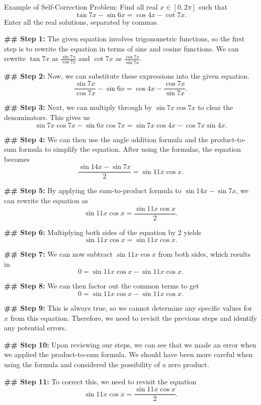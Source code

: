 \begin{promptbox}{Example of Self-Correction}
Problem: Find all real $x \in [0, 2 \pi]$ such that
\[\tan 7x - \sin 6x = \cos 4x - \cot 7x.\]
Enter all the real solutions, separated by commas.

\textbf{\#\# Step 1:} The given equation involves trigonometric functions, so the first step is to rewrite the equation in terms of sine and cosine functions. We can rewrite $\tan 7x$ as $\frac{\sin 7x}{\cos 7x}$ and $\cot 7x$ as $\frac{\cos 7x}{\sin 7x}.$

\textbf{\#\# Step 2:} Now, we can substitute these expressions into the given equation.
\[\frac{\sin 7x}{\cos 7x} - \sin 6x = \cos 4x - \frac{\cos 7x}{\sin 7x}.\]

\textbf{\#\# Step 3:} Next, we can multiply through by $\sin 7x \cos 7x$ to clear the denominators. This gives us
\[\sin 7x \cos 7x - \sin 6x \cos 7x = \sin 7x \cos 4x - \cos 7x \sin 4x.\]

\textbf{\#\# Step 4:} We can then use the angle addition formula and the product-to-sum formula to simplify the equation. After using the formulas, the equation becomes
\[\frac{\sin 14x - \sin 7x}{2} = \sin 11x \cos x.\]

\textbf{\#\# Step 5:} By applying the sum-to-product formula to $\sin 14x - \sin 7x$, we can rewrite the equation as
\[\sin 11x \cos x = \frac{\sin 11x \cos x}{2}.\]

\textbf{\#\# Step 6:} Multiplying both sides of the equation by 2 yields
\[\sin 11x \cos x = \sin 11x \cos x.\]

\textbf{\#\# Step 7:} We can now subtract $\sin 11x \cos x$ from both sides, which results in
\[0 = \sin 11x \cos x - \sin 11x \cos x.\]

\textbf{\#\# Step 8:} We can then factor out the common terms to get
\[0 = \sin 11x \cos x - \sin 11x \cos x.\]

\textbf{\#\# Step 9:} This is always true, so we cannot determine any specific values for $x$ from this equation. Therefore, we need to revisit the previous steps and identify any potential errors.

\textbf{\#\# Step 10:} {\color{red} Upon reviewing our steps, we can see that we made an error when we applied the product-to-sum formula. We should have been more careful when using the formula and considered the possibility of a zero product.}

\textbf{\#\# Step 11:} To correct this, we need to revisit the equation
\[\sin 11x \cos x = \frac{\sin 11x \cos x}{2}.\]


\end{promptbox}
